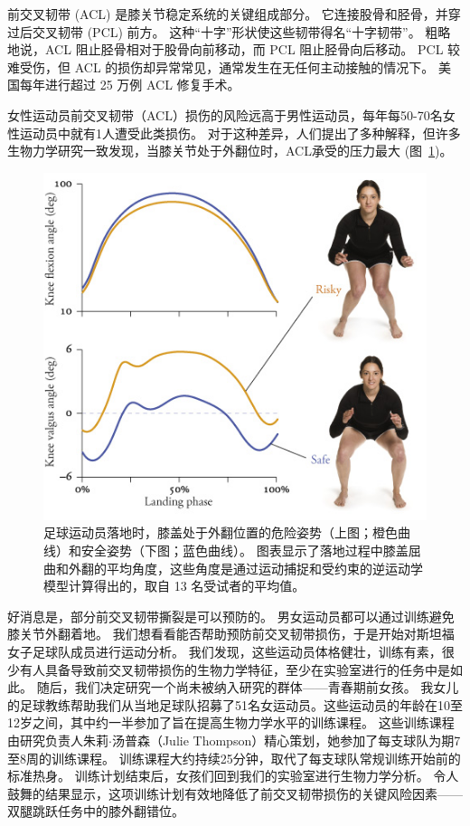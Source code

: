 前交叉韧带 (ACL) 是膝关节稳定系统的关键组成部分。
它连接股骨和胫骨，并穿过后交叉韧带 (PCL) 前方。
这种“十字”形状使这些韧带得名“十字韧带”。
粗略地说，ACL 阻止胫骨相对于股骨向前移动，而 PCL 阻止胫骨向后移动。
PCL 较难受伤，但 ACL 的损伤却异常常见，通常发生在无任何主动接触的情况下。
美国每年进行超过 25 万例 ACL 修复手术。


女性运动员前交叉韧带（ACL）损伤的风险远高于男性运动员，每年每50-70名女性运动员中就有1人遭受此类损伤\cite{bates2016motion}。
对于这种差异，人们提出了多种解释，但许多生物力学研究一致发现，当膝关节处于外翻位时，ACL承受的压力最大 (图~\ref{fig:7_17})。


\begin{figure}[!htb]
	\centering
	\includegraphics[width=0.8\linewidth]{chap7/7_17}
	\caption{足球运动员落地时，膝盖处于外翻位置的危险姿势（上图；橙色曲线）和安全姿势（下图；蓝色曲线）。
		图表显示了落地过程中膝盖屈曲和外翻的平均角度，这些角度是通过运动捕捉和受约束的逆运动学模型计算得出的，取自 13 名受试者的平均值\cite{thompson2017biomechanical}。 \label{fig:7_17}}
\end{figure}


好消息是，部分前交叉韧带撕裂是可以预防的。
男女运动员都可以通过训练避免膝关节外翻着地。
我们想看看能否帮助预防前交叉韧带损伤，于是开始对斯坦福女子足球队成员进行运动分析。
我们发现，这些运动员体格健壮，训练有素，很少有人具备导致前交叉韧带损伤的生物力学特征，至少在实验室进行的任务中是如此。
随后，我们决定研究一个尚未被纳入研究的群体——青春期前女孩。
我女儿的足球教练帮助我们从当地足球队招募了51名女运动员。这些运动员的年龄在10至12岁之间，其中约一半参加了旨在提高生物力学水平的训练课程。
这些训练课程由研究负责人朱莉$\cdot$汤普森（Julie Thompson）精心策划，她参加了每支球队为期7至8周的训练课程。
训练课程大约持续25分钟，取代了每支球队常规训练开始前的标准热身。
训练计划结束后，女孩们回到我们的实验室进行生物力学分析。
令人鼓舞的结果显示，这项训练计划有效地降低了前交叉韧带损伤的关键风险因素——双腿跳跃任务中的膝外翻错位。


